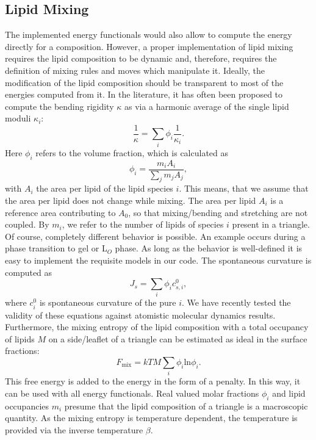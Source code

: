 \documentclass[twocolumn]{biophys-new}
\begin{document}
\subsection*{Lipid Mixing}

The implemented energy functionals would also allow to compute the energy directly for a composition. However, a proper implementation of lipid mixing requires the lipid composition to be dynamic and, therefore, requires the definition of mixing rules and moves which manipulate it. Ideally, the modification of the lipid composition should be transparent to most of the energies computed from it. In the literature,
it has often been proposed to compute the bending rigidity $\kappa$ as\cite{doi:10.1021/ct400492e,doi:10.1021/la00047a035} via a harmonic average of the single lipid moduli $\kappa_i$:
\begin{equation}
 \frac{1}{\kappa} = \sum_i \phi_i \frac{1}{\kappa_i}.
\end{equation}
Here $\phi_i$ refers to the volume fraction, which is calculated as 
\begin{equation}
 \phi_i = \frac{m_i A_i}{\sum_j m_j A_j}, 
\end{equation}
with $A_i$ the area per lipid of the lipid species $i$. This means, that we assume that the area per lipid does not change while mixing. The area per lipid $A_i$ is a reference area contributing to $A_0$, so that mixing/bending and stretching are not coupled. By $m_i$, we refer to the number of lipids of species $i$ present in a triangle.
Of course, completely different behavior is possible.
An example occurs during a phase transition to gel or L$_O$ phase. As long as the behavior is well-defined it is easy to implement the requisite models in our code.
The spontaneous curvature is computed as
\begin{equation}
 J_s = \sum_i \phi_i c^0_{s,i},
\end{equation}
where $c^0_{i}$ is spontaneous curvature of the pure $i$.\cite{Andelman_1994, Khelashvili20091626}
We have recently tested the validity of these equations against atomistic molecular dynamics results.\cite{Konar2023.02.06.527315}
Furthermore, the mixing entropy of the lipid composition with a total occupancy of lipids $M$ on a side/leaflet of a triangle can be estimated as ideal in the surface fractions\cite{Andelman_1994}:
\begin{equation}
 F_\mathrm{mix} = kT M \sum_i {\phi_i} \mathrm{ln} \phi_i. 
\end{equation}
This free energy is added to the energy in the form of a penalty. In this way, it can be used with all energy functionals. Real valued molar fractions $\phi_i$ and lipid occupancies $m_i$ presume that the lipid composition of a triangle is a macroscopic quantity. As the mixing entropy is temperature dependent, the temperature is provided via the inverse temperature $\beta$. 
\end{document}
